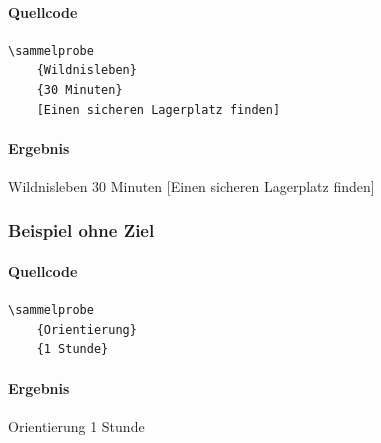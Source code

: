 \paragraph{Quellcode}

\begin{Verbatim}
\sammelprobe
    {Wildnisleben}
    {30 Minuten}
    [Einen sicheren Lagerplatz finden]
\end{Verbatim}

\paragraph{Ergebnis}

\sammelprobe
    {Wildnisleben}
    {30 Minuten}
    [Einen sicheren Lagerplatz finden]


\subsubsection*{Beispiel ohne Ziel}

\paragraph{Quellcode}

\begin{Verbatim}
\sammelprobe
    {Orientierung}
    {1 Stunde}
\end{Verbatim}

\paragraph{Ergebnis}

\sammelprobe
    {Orientierung}
    {1 Stunde}
